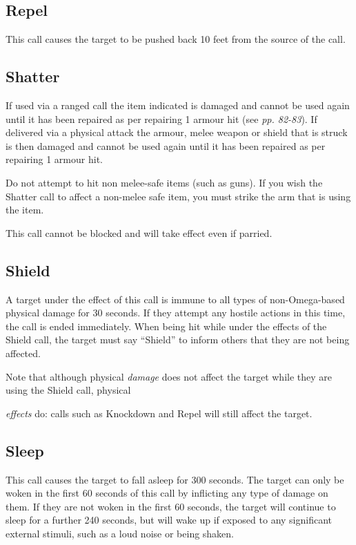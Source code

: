\subsection{Repel}

This call causes the target to be pushed back 10 feet from the source of the call.

\subsection{Shatter}

If used via a ranged call the item indicated is damaged and cannot be used again until it has been repaired as per repairing 1 armour hit (see \textit{pp. 82-83}). If delivered via a physical attack the armour, melee weapon or shield that is struck is then damaged and cannot be used again until it has been repaired as per repairing 1 armour hit.

Do not attempt to hit non melee-safe items (such as guns). If you wish the Shatter call to affect a non-melee safe item, you must strike the arm that is using the item.

This call cannot be blocked and will take effect even if parried.

\subsection{Shield}

A target under the effect of this call is immune to all types of non-Omega-based physical damage for 30 seconds. If they attempt any hostile actions in this time, the call is ended immediately. When being hit while under the effects of the Shield call, the target must say ``Shield'' to inform others that they are not being affected.

Note that although physical \textit{damage} does not affect the target while they are using the Shield call, physical

\textit{effects} do: calls such as Knockdown and Repel will still affect the target.

\subsection{Sleep}

This call causes the target to fall asleep for 300 seconds. The target can only be woken in the first 60 seconds of this call by inflicting any type of damage on them. If they are not woken in the first 60 seconds, the target will continue to sleep for a further 240 seconds, but will wake up if exposed to any significant external stimuli, such as a loud noise or being shaken.

